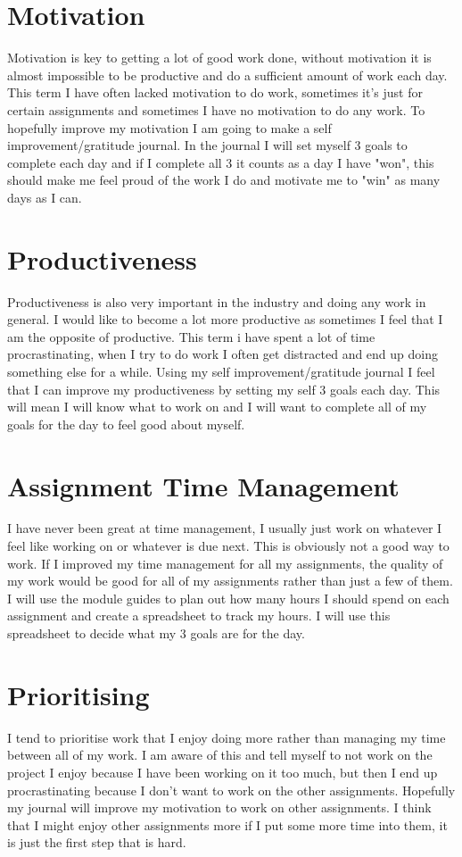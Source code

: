 \documentclass{scrartcl}
\begin{document}
\section{Motivation}
Motivation is key to getting a lot of good work done, without motivation it is almost impossible to be productive and do a sufficient amount of work each day. This term I have often lacked motivation to do work, sometimes it's just for certain assignments and sometimes I have no motivation to do any work. To hopefully improve my motivation I am going to make a self improvement/gratitude journal. In the journal I will set myself 3 goals to complete each day and if I complete all 3 it counts as a day I have "won", this should make me feel proud of the work I do and motivate me to "win" as many days as I can.   

\section{Productiveness}
Productiveness is also very important in the industry and doing any work in general. I would like to become a lot more productive as sometimes I feel that I am the opposite of productive. This term i have spent a lot of time procrastinating, when I try to do work I often get distracted and end up doing something else for a while. Using my self improvement/gratitude journal I feel that I can improve my productiveness by setting my self 3 goals each day. This will mean I will know what to work on and I will want to complete all of my goals for the day to feel good about myself. 

\section{Assignment Time Management}
I have never been great at time management, I usually just work on whatever I feel like working on or whatever is due next. This is obviously not a good way to work. If I improved my time management for all my assignments, the quality of my work would be good for all of my assignments rather than just a few of them. I will use the module guides to plan out how many hours I should spend on each assignment and create a spreadsheet to track my hours. I will use this spreadsheet to decide what my 3 goals are for the day.   

\section{Prioritising}
I tend to prioritise work that I enjoy doing more rather than managing my time between all of my work. I am aware of this and tell myself to not work on the project I enjoy because I have been working on it too much, but then I end up procrastinating because I don't want to work on the other assignments. Hopefully my journal will improve my motivation to work on other assignments. I think that I might enjoy other assignments more if I put some more time into them, it is just the first step that is hard.     
\end{document}
